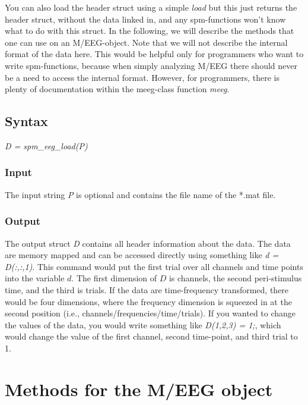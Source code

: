 You can also load the header struct using a
simple \textit{load} but this just returns the header struct, without the
data linked in, and any spm-functions won't know what to do with this
struct. In the following, we will describe the methods
that one can use on an M/EEG-object. Note that we will not describe
the internal format of the data here. This would be helpful only for
programmers who want to write spm-functions, because when simply
analyzing M/EEG there should never be a need to access the internal
format. However, for programmers, there is plenty of documentation
within the meeg-class function \textit{meeg}. 

\subsection{Syntax}
\textit{D = spm\_eeg\_load(P)}
\\

\subsubsection{Input}
The input string {\textit P} is optional and contains the file name of the
*.mat file.

\subsubsection{Output}
The output struct {\textit D} contains all header information about the
data. The data are memory mapped and can be accessed directly using
something like \textit{d = D(:,:,1)}. This command would put the first
trial over all channels and time points into the variable $d$. The
first dimension of $D$ is channels, the second peri-stimulus time, and
the third is trials. If the data are time-frequency transformed, there
would be four dimensions, where the frequency dimension is squeezed in
at the second position (i.e., channels/frequencies/time/trials). If
you wanted to change the values of the data, you would write something
like \textit{D(1,2,3) = 1;}, which would change the value of the first
channel, second time-point, and third trial to 1.


\section{Methods for the M/EEG object}

